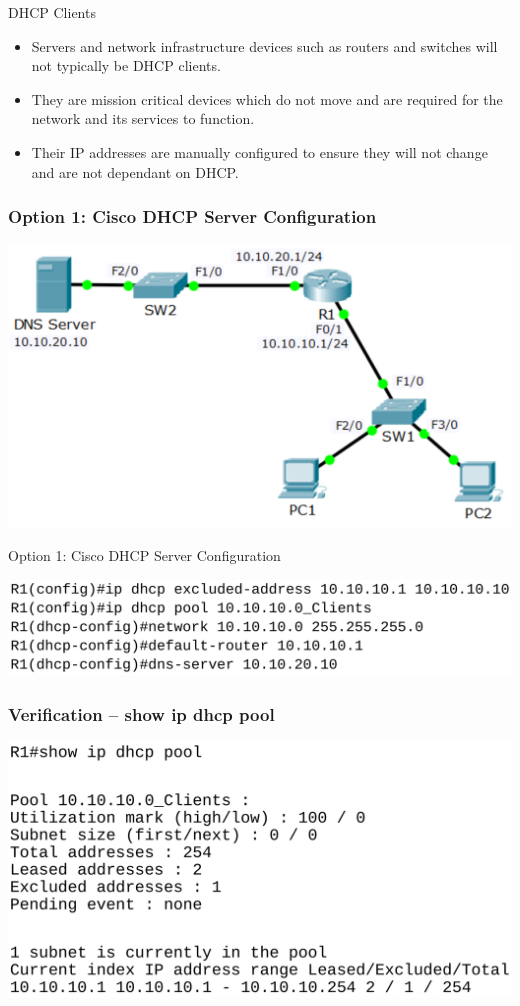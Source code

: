 \documentclass[pdflatex,compress,mathserif]{beamer}
\begin{document}
\begin{frame}{DHCP Clients}
	\begin{itemize}
		\item Servers and network infrastructure devices such as routers and
switches will not typically be DHCP clients.
		\item They are mission critical devices which do not move and are required
for the network and its services to function.
		\item Their IP addresses are manually configured to ensure they will not
change and are not dependant on DHCP.
	\end{itemize}
\end{frame}

\begin{frame}
	\frametitle{Option 1: Cisco DHCP Server Configuration}
	\begin{center}
		\includegraphics[width=0.8\linewidth]{img/img03}
	\end{center}
\end{frame}

\begin{frame}{Option 1: Cisco DHCP Server Configuration}
	\begin{center}
		\includegraphics[width=0.8\linewidth]{img/img04}
	\end{center}
\end{frame}

\begin{frame}
	\frametitle{Verification – show ip dhcp pool}
	\begin{center}
		\includegraphics[width=\linewidth]{img/img05}
	\end{center}
\end{frame}
\end{document}
